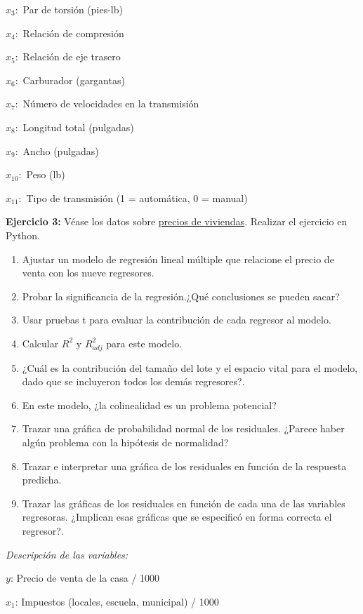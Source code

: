 \documentclass[
]{book}
\begin{document}
\(x_3:\) Par de torsión (pies-lb)

\(x_4:\) Relación de compresión

\(x_5:\) Relación de eje trasero

\(x_6:\) Carburador (gargantas)

\(x_7:\) Número de velocidades en la transmisión

\(x_8:\) Longitud total (pulgadas)

\(x_9:\) Ancho (pulgadas)

\(x_{10}:\) Peso (lb)

\(x_{11}:\) Tipo de transmisión (1 = automática, 0 = manual)

\textbf{Ejercicio 3:} Véase los datos sobre \href{https://github.com/HaydeePeruyero/MultivariateStatisticalAnalysis/tree/main/data/Precios_de_viviendas}{precios de viviendas}. Realizar el ejercicio en Python.

\begin{enumerate}
\def\labelenumi{\alph{enumi})}
\item
  Ajustar un modelo de regresión lineal múltiple que relacione el precio de venta con los nueve regresores.
\item
  Probar la significancia de la regresión.¿Qué conclusiones se pueden sacar?
\item
  Usar pruebas t para evaluar la contribución de cada regresor al modelo.
\item
  Calcular \(R^2\) y \(R^2_{adj}\) para este modelo.
\item
  ¿Cuál es la contribución del tamaño del lote y el espacio vital para el modelo, dado que se incluyeron todos los demás regresores?.
\item
  En este modelo, ¿la colinealidad es un problema potencial?
\item
  Trazar una gráfica de probabilidad normal de los residuales. ¿Parece haber algún problema con la hipótesis de normalidad?
\item
  Trazar e interpretar una gráfica de los residuales en función de la respuesta predicha.
\item
  Trazar las gráficas de los residuales en función de cada una de las variables regresoras. ¿Implican esas gráficas que se especificó en forma correcta el regresor?.
\end{enumerate}

\emph{Descripción de las variables:}

\(y\): Precio de venta de la casa / 1000

\(x_{1}\): Impuestos (locales, escuela, municipal) / 1000
\end{document}
